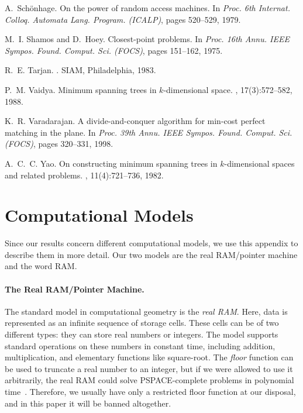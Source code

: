 \documentclass[11pt]{paper}
\begin{document}
\begin{thebibliography}{10}
A.~Sch{\"o}nhage.
\newblock On the power of random access machines.
\newblock In {\em Proc. 6th Internat. Colloq. Automata Lang. Program. (ICALP)},
  pages 520--529, 1979.

M.~I. Shamos and D.~Hoey.
\newblock Closest-point problems.
\newblock In {\em Proc. 16th Annu. IEEE Sympos. Found. Comput. Sci. (FOCS)},
  pages 151--162, 1975.

R.~E. Tarjan.
.
\newblock SIAM, Philadelphia, 1983.

P.~M. Vaidya.
\newblock Minimum spanning trees in {$k$}-dimensional space.
, 17(3):572--582, 1988.

K.~R. Varadarajan.
\newblock A divide-and-conquer algorithm for min-cost perfect matching in the
  plane.
\newblock In {\em Proc. 39th Annu. IEEE Sympos. Found. Comput. Sci. (FOCS)},
  pages 320--331, 1998.

A.~C.~C. Yao.
\newblock On constructing minimum spanning trees in {$k$}-dimensional spaces
  and related problems.
, 11(4):721--736, 1982.

\end{thebibliography}
\normalsize























\appendix
  \section {Computational Models}
  \label{app:models}

Since our results concern different computational models, 
we use this appendix to describe them in more detail. 
Our two models are the real RAM/pointer machine and 
the word RAM.
\paragraph{The Real RAM/Pointer Machine.}
The standard model in computational geometry
is the \emph{real RAM}. Here, data is represented
as an infinite sequence of storage cells. These cells
can be of two different types: they can store real numbers
or integers. The model supports standard operations on
these numbers in constant time, including addition, 
multiplication, and elementary functions
like square-root.
The \emph{floor} function can be used to truncate a 
real number to an integer, but if we were allowed to 
use it arbitrarily, the real RAM could solve PSPACE-complete
problems in polynomial time~\cite{Schoenhage79}.
Therefore, we usually have only a restricted floor function 
at our disposal,
and in this paper it will be banned altogether. 
\end{document}
